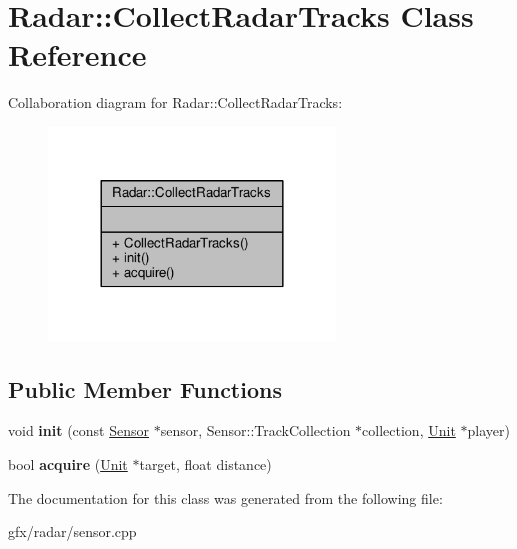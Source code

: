 \hypertarget{classRadar_1_1CollectRadarTracks}{}\section{Radar\+:\+:Collect\+Radar\+Tracks Class Reference}
\label{classRadar_1_1CollectRadarTracks}


Collaboration diagram for Radar\+:\+:Collect\+Radar\+Tracks\+:
\nopagebreak
\begin{figure}[H]
\begin{center}
\leavevmode
\includegraphics[width=216pt]{dc/d70/classRadar_1_1CollectRadarTracks__coll__graph}
\end{center}
\end{figure}
\subsection*{Public Member Functions}
\begin{DoxyCompactItemize}
\item 
void {\bfseries init} (const \hyperlink{classRadar_1_1Sensor}{Sensor} $\ast$sensor, Sensor\+::\+Track\+Collection $\ast$collection, \hyperlink{classUnit}{Unit} $\ast$player)\hypertarget{classRadar_1_1CollectRadarTracks_a5f9f8d4086e144ee62485954657e86e7}{}\label{classRadar_1_1CollectRadarTracks_a5f9f8d4086e144ee62485954657e86e7}

\item 
bool {\bfseries acquire} (\hyperlink{classUnit}{Unit} $\ast$target, float distance)\hypertarget{classRadar_1_1CollectRadarTracks_a855389dd118e9dd292ae481e8bbe1629}{}\label{classRadar_1_1CollectRadarTracks_a855389dd118e9dd292ae481e8bbe1629}

\end{DoxyCompactItemize}


The documentation for this class was generated from the following file\+:\begin{DoxyCompactItemize}
\item 
gfx/radar/sensor.\+cpp\end{DoxyCompactItemize}
